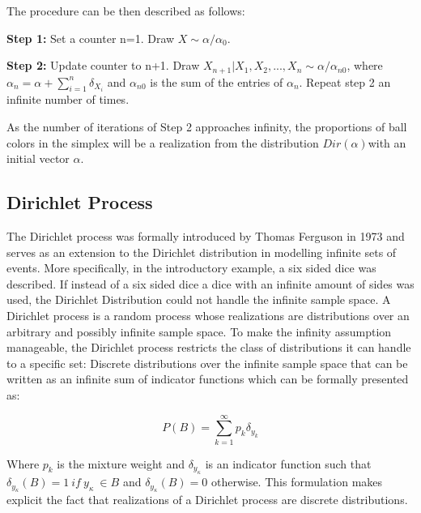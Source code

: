 \documentclass[twoside,hidelinks]{article}
\begin{document}
The procedure can be then described as follows:
\begin{compactitem}

	\item \textbf{Step 1:} Set a counter n=1. Draw $ X \sim \alpha / \alpha_0 $. 
	\item \textbf{Step 2:} Update counter to n+1. Draw $ X_{n+1} | X_1, X_2, ..., X_n \sim \alpha / \alpha_{n0}$, where $\alpha_n = \alpha + \sum_{i=1}^n \delta_{X_i} $ and $ \alpha_{n0}$ is the sum of the entries of $\alpha_n$. Repeat step 2 an infinite number of times.
\end{compactitem}

As the number of iterations of Step 2 approaches infinity, the proportions of ball colors in the simplex will be a realization from the distribution $Dir(\alpha)$with an initial vector $\alpha$.



\subsection{Dirichlet Process}

The Dirichlet process was formally introduced by Thomas Ferguson in 1973 and serves as an extension to the Dirichlet distribution in modelling infinite sets of events. More specifically, in the introductory example, a six sided dice was described. If instead of a six sided dice a dice with an infinite amount of sides was used, the Dirichlet Distribution could not handle the infinite sample space. A Dirichlet process is a random process whose realizations are distributions over an arbitrary and possibly infinite sample space. To make the infinity assumption manageable, the Dirichlet process restricts the class of distributions it can handle to a specific set: Discrete distributions over the infinite sample space that can be written as an infinite sum of indicator functions which can be formally presented as:

\begin{equation}
 P( B ) = \sum_{k=1}^\infty p_k \delta_{y_k} 
 \end{equation}

Where $p_k$ is the mixture weight and $\delta_{y_\kappa}$ is an indicator function such that $\delta_{y_\kappa} (B)=1\ if\ y_{\kappa}\ \in B$ and  $\delta_{y_\kappa}(B)=0$ otherwise. This formulation makes explicit the fact that realizations of a Dirichlet process are discrete distributions.
\end{document}
